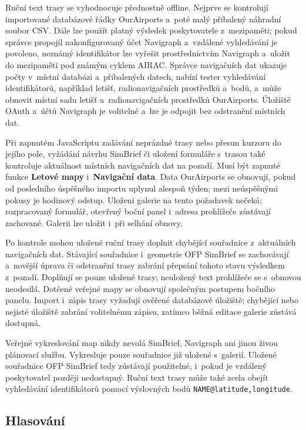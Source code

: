 \documentclass[11pt,a4paper]{article}
\newcommand{\ui}[1]{\textbf{#1}}
\newcommand{\codeword}[1]{\nolinkurl{#1}}
\begin{document}
Ruční text trasy se vyhodnocuje přednostně offline. Nejprve se kontrolují
importované databázové řádky OurAirports a~poté malý přibalený náhradní soubor
CSV. Dále lze použít platný výsledek poskytovatele z~mezipaměti; pokud správce
propojil nakonfigurovaný účet Navigraph a~vzdálené vyhledávání je povoleno,
neznámý identifikátor lze vyřešit prostřednictvím Navigraph a~uložit do
mezipaměti pod známým cyklem AIRAC. Správce navigačních dat ukazuje počty
v~místní databázi a~přibalených datech, nabízí tester vyhledávání
identifikátorů, například letišť, radionavigačních prostředků a~bodů, a~může
obnovit místní sadu letišť a~radionavigačních prostředků OurAirports. Úložiště
OAuth a~účtů Navigraph je volitelné a~lze je odpojit bez odstranění místních
dat.

Při zapnutém JavaScriptu zadávání neprázdné trasy nebo přesun kurzoru do jejího
pole, vyžádání návrhu SimBrief či uložení formuláře s~trasou také kontroluje
aktuálnost místních navigačních dat na pozadí. Musí být zapnuté funkce
\ui{Letové mapy} i~\ui{Navigační data}. Data OurAirports se obnovují, pokud od
posledního úspěšného importu uplynul alespoň týden; mezi neúspěšnými pokusy je
hodinový odstup. Uložení galerie na tento požadavek nečeká; rozpracovaný
formulář, otevřený boční panel i~adresa prohlížeče zůstávají zachované. Galerii
lze uložit i~při selhání obnovy.

Po kontrole mohou uložené ruční trasy doplnit chybějící souřadnice z~aktuálních
navigačních dat. Stávající souřadnice i~geometrie OFP SimBrief se zachovávají
a~novější úprava či odstranění trasy zabrání přepsání tohoto stavu výsledkem
z~pozadí. Doplňují se pouze uložené trasy; neuložený text prohlížeče se
s~obnovou neodesílá. Dotčené veřejné mapy se obnovují společným postupem bočního
panelu. Import i~zápis trasy vyžadují ověřené databázové úložiště; chybějící
nebo nejisté úložiště zabrání volitelnému zápisu, zatímco běžná editace galerie
zůstává dostupná.

Veřejné vykreslování map nikdy nevolá SimBrief, Navigraph ani jinou živou
plánovací službu. Vykresluje pouze souřadnice již uložené s~galerií. Uložené
souřadnice OFP SimBrief tedy zůstávají použitelné, i~pokud je vzdálený
poskytovatel později nedostupný. Ruční text trasy může také zcela obejít
vyhledávání identifikátorů pomocí výslovných bodů
\codeword{NAME@latitude,longitude}.

\subsection{Hlasování}
\end{document}
